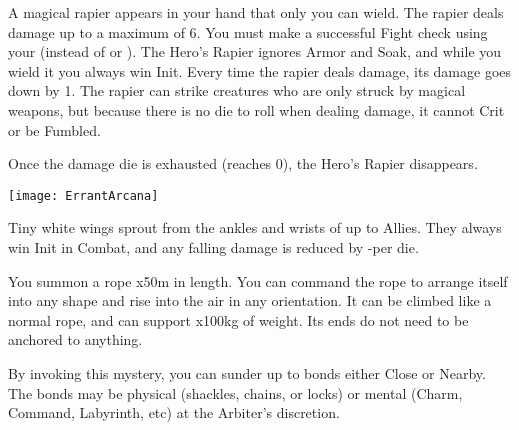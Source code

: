 {\MYSTERY [
  Name = Corsair's Blade,
  Link = arcana-mystery-corsairs-blade,
  Paradigm = Force,
  Save = n/a,
  Duration = Session,
  Target = Self
]

A magical rapier appears in your hand that only you can wield.  The rapier deals \DICE damage up to a maximum of 6.  You must make a successful Fight check using your \FOC (instead of \VIG or \DEX).  The Hero's Rapier ignores Armor and Soak, and while you wield it you always win Init.  Every time the rapier deals damage, its damage goes down by 1. The rapier can strike creatures who are only struck by magical weapons, but because there is no die to roll when dealing damage, it cannot Crit or be Fumbled.  

Once the damage die is exhausted (reaches 0), the Hero's Rapier disappears.


  \begin{center}
  \texttt{[image: ErrantArcana]}
  \end{center}



\MYSTERY [
  Name = Duelists' Wings,
  Link = arcana-mystery-duelists-wings,
  Paradigm = Biomancy,
  Save = n/a,
  Duration = Combat or \SUM Minutes,
  Target = Self or Close Target(s)
]

Tiny white wings sprout from the ankles and wrists of up to \DICE Allies.  They always win Init in Combat, and any falling damage is reduced by -\DICE per die.

\MYSTERY [
  Name = Ropework,
  Link = arcana-mystery-ropework,
  Paradigm = Entropy,
  Save = N,
  Duration = \SUM Minutes,
  Target = Close Target(s)
]

You summon a rope \DICE x50m in length.  You can command the rope to arrange itself into any shape and rise into the air in any orientation.  It can be climbed like a normal rope, and can support \DICE x100kg of weight.  Its ends do not need to be anchored to anything.

\MYSTERY [
  Name = Shatter Bonds,
  Link = arcana-mystery-shatter-bonds,
  Paradigm = Force,
  Save = n/a,
  Duration = Instant,
  Target = Close or Nearby
]

By invoking this mystery, you can sunder up to \DICE bonds either Close or Nearby.  The bonds may be physical (shackles, chains, or locks) or mental (Charm, Command, Labyrinth, etc) at the Arbiter's discretion.

\MYSTERY [
  Name = Skald's Tongue,
  Link = arcana-mystery-skalds-tongue,
  Paradigm = Entropy,
  Save = n/a,
  Duration = Breather or Bivouac,
  Target = Close Target(s)
]

}

